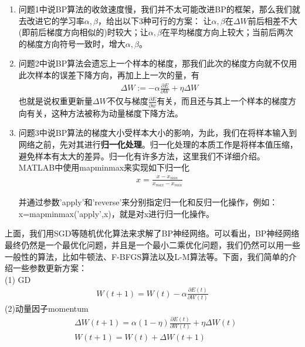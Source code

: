             \begin{enumerate}
            \item 问题1中说BP算法的收敛速度慢，我们并不太可能改进BP的框架，那么我们就去改进它的学习率$\alpha,\beta$，给出以下3种可行的方案：
            让$\alpha,\beta$在$\Delta W$前后相差不大(即前后梯度方向相似的)时较大；让$\alpha,\beta$在平均梯度方向上较大；当前后两次的梯度方向符号一致时，增大$\alpha,\beta$。
            \item 问题2中说BP算法会遗忘上一个样本的梯度，那我们此次的梯度方向就不仅用此次样本的误差下降方向，再加上上一次的量，有
            \begin{align*}
            \Delta W := -\alpha\frac{\partial E}{\partial W} + \eta \Delta W
            \end{align*}
            也就是说权重更新量$\Delta W$不仅与梯度$\frac{\partial E}{\partial w}$有关，而且还与其上一个样本的梯度方向有关，这种方法被称为动量梯度下降方法。
            \item 问题3中说BP算法的梯度大小受样本大小的影响，为此，我们在将样本输入到网络之前，先对其进行\textbf{归一化处理}。归一化处理的本质工作是将样本值压缩，避免样本有太大的差异。归一化有许多方法，这里我们不详细介绍。MATLAB中使用mapminmax来实现如下归一化
            \begin{align*}
            x = \frac{x-x_{min}}{x_{max} - x_{min}}
            \end{align*}
            \par
            并通过参数'apply'和'reverse'来分别指定归一化和反归一化操作，例如：x=mapminmax('apply',x)，就是对x进行归一化操作。
            \end{enumerate}
            \par
            上面，我们用SGD等随机优化算法来求解了BP神经网络。可以看出，BP神经网络最终仍然是一个最优化问题，并且是一个最小二乘优化问题，我们仍然可以用一些一般性的算法，比如牛顿法、F-BFGS算法以及L-M算法等。下面，我们简单的介绍一些参数更新方案：\\
            (1) GD
            \begin{align*}
            W(t+1)= W(t)-\alpha \frac{\partial E(t)}{\partial W(t)}
            \end{align*}
            (2)动量因子momentum
            \begin{align*}
            & \Delta W(t+1)= \alpha(1-\eta)\frac{\partial E(t)}{\partial W(t)} + \eta \Delta W(t)\\
            & W(t+1)=W(t)+\Delta W(t+1)
            \end{align*}
